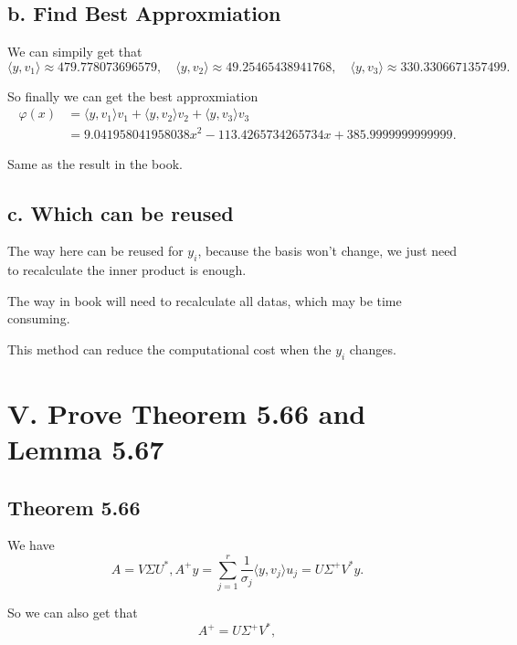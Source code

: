 \documentclass[a4paper]{article}
\begin{document}
\subsection*{b. Find Best Approxmiation}

We can simpily get that 
\begin{equation}
    \langle y, v_1 \rangle \approx 479.778073696579, \quad \langle y, v_2 \rangle \approx 49.25465438941768, \quad \langle y, v_3 \rangle \approx 330.3306671357499.
\end{equation}

So finally we can get the best approxmiation
\begin{equation}
    \begin{aligned}
        \varphi (x) &= \langle y, v_1 \rangle v_1 + \langle y, v_2 \rangle v_2 + \langle y, v_3 \rangle v_3 \\
         &= 9.041958041958038 x^2 -113.4265734265734 x + 385.9999999999999.
    \end{aligned}
\end{equation}

Same as the result in the book.

\subsection*{c. Which can be reused}

The way here can be reused for $y_i$, because the basis won't change, we just need to recalculate the inner product is enough. 

The way in book will need to recalculate all datas, which may be time consuming.

This method can reduce the computational cost when the $y_i$ changes. 


\section*{V. Prove Theorem 5.66 and Lemma 5.67}

\subsection*{Theorem 5.66}

We have 
\begin{equation}
    A = V\Sigma U^*, A^+ y = \sum_{j=1}^{r} \frac{1}{\sigma_j} \langle y, v_j \rangle u_j = U \Sigma^{+} V^* y.
\end{equation}

So we can also get that 
\begin{equation}
    A^+ = U \Sigma^{+} V^*,
\end{equation}
\end{document}

